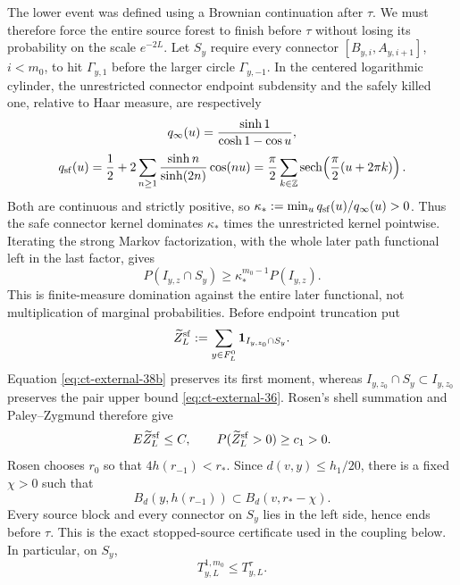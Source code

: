 \documentclass[12pt,reqno]{amsart}
\theoremstyle{plain}
\theoremstyle{definition}
\theoremstyle{remark}
\numberwithin{equation}{section}
\begin{document}
The lower event was defined using a Brownian continuation after $\tau$.
We must therefore force the entire source forest to finish before $\tau$
without losing its probability on the scale $e^{-2L}$.  Let $S_y$ require every connector
$[B_{y,i},A_{y,i+1}]$, $i<m_0$, to hit $\Gamma_{y,1}$ before the
larger circle $\Gamma_{y,-1}$.  In the centered logarithmic cylinder,
the unrestricted connector endpoint subdensity and the safely killed
one, relative to Haar measure, are respectively
\[
q_\infty(u)={\sinh1\over\cosh1-\cos u},
\]
\begin{equation}
q_{\rm sf}(u)=\frac12+2\sum_{n\ge1}{\sinh n\over\sinh(2n)}\cos(nu)
 =\frac\pi2\sum_{k\in\mathbb Z}
       \operatorname {sech}\!\left({\pi\over2}(u+2\pi k)\right).\label{eq:ct-external-38a}
\end{equation}
Both are continuous and strictly positive, so
$\kappa_*:=\min_uq_{\rm sf}(u)/q_\infty(u)>0$.  Thus the safe
connector kernel dominates $\kappa_*$ times the unrestricted kernel
pointwise.  Iterating the strong Markov factorization, with the whole
later path functional left in the last factor, gives
\begin{equation}
P(I_{y,z}\cap S_y)\ge\kappa_*^{m_0-1}P(I_{y,z}).\label{eq:ct-external-38b}
\end{equation}
This is finite-measure domination against the entire later functional,
not multiplication of marginal probabilities.  Before endpoint
truncation put
\[
\widetilde Z_L^{\rm sf}:=\sum_{y\in F_L^0}{\bf1}_{I_{y,z_0}\cap S_y}.
\]
Equation \eqref{eq:ct-external-38b} preserves its first moment, whereas
$I_{y,z_0}\cap S_y\subset I_{y,z_0}$ preserves the pair upper bound
\eqref{eq:ct-external-36}.  Rosen's shell summation and Paley--Zygmund therefore give
\begin{equation}
E\widetilde Z_L^{\rm sf}\le C,\qquad
 P(\widetilde Z_L^{\rm sf}>0)\ge c_1>0.\label{eq:ct-external-38c}
\end{equation}
Rosen chooses $r_0$ so that $4h(r_{-1})<r_*$.  Since
$d(v,y)\le h_1/20$, there is a fixed $\chi>0$ such that
\begin{equation}
B_d(y,h(r_{-1}))\subset B_d(v,r_*-\chi).\label{eq:ct-external-38d}
\end{equation}
Every source block and every connector on $S_y$ lies in the left
side, hence ends before $\tau$.  This is the exact stopped-source
certificate used in the coupling below.  In particular, on $S_y$,
\begin{equation}
T_{y,L}^{1,m_0}\le T_{y,L}^{\tau}.\label{eq:ct-external-38e}
\end{equation}
\end{document}
